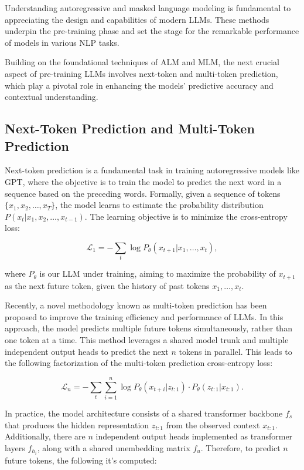 Understanding autoregressive and masked language modeling is fundamental to appreciating the design and capabilities of modern LLMs. These methods underpin the pre-training phase and set the stage for the remarkable performance of models in various NLP tasks.

Building on the foundational techniques of ALM and MLM, the next crucial aspect of pre-training LLMs involves next-token and multi-token prediction, which play a pivotal role in enhancing the models’ predictive accuracy and contextual understanding.

\subsection{Next-Token Prediction and Multi-Token Prediction}

Next-token prediction is a fundamental task in training autoregressive models like GPT, where the objective is to train the model to predict the next word in a sequence based on the preceding words. Formally, given a sequence of tokens \( \{x_1, x_2, \ldots, x_T\} \), the model learns to estimate the probability distribution \( P(x_t | x_1, x_2, \ldots, x_{t-1}) \). The learning objective is to minimize the cross-entropy loss:

\begin{equation}
    \mathcal{L}_1 = - \sum_{t} \log P_\theta (x_{t+1} | x_1, \ldots, x_t),
\end{equation}

where \( P_\theta \) is our LLM under training, aiming to maximize the probability of \( {x_{t+1}} \) as the next future token, given the history of past tokens \( {x_1, \ldots, x_t} \).

Recently, a novel methodology known as multi-token prediction has been proposed to improve the training efficiency and performance of LLMs. In this approach, the model predicts multiple future tokens simultaneously, rather than one token at a time. This method leverages a shared model trunk and multiple independent output heads to predict the next \( n \) tokens in parallel. This leads to the following factorization of the multi-token prediction cross-entropy
loss:

\begin{equation}
    \mathcal{L}_n = - \sum_{t} \sum_{i=1}^{n} \log P_\theta (x_{t+i} | z_{t:1}) \cdot P_\theta(z_{t:1} | x_{t:1}).
\end{equation}

In practice, the model architecture consists of a shared transformer backbone \( f_s \) that produces the hidden representation \( z_{t:1} \) from the observed context \( x_{t:1} \). Additionally, there are \( n \) independent output heads implemented as transformer layers \( f_{h_i} \), along with a shared unembedding matrix \( f_u \). Therefore, to predict \( n \) future tokens, the following it's computed:

